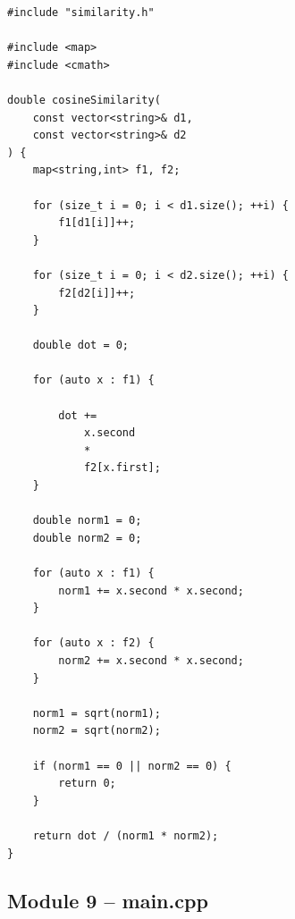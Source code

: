 \begin{lstlisting}
#include "similarity.h"

#include <map>
#include <cmath>

double cosineSimilarity(
    const vector<string>& d1,
    const vector<string>& d2
) {
    map<string,int> f1, f2;

    for (size_t i = 0; i < d1.size(); ++i) {
        f1[d1[i]]++;
    }

    for (size_t i = 0; i < d2.size(); ++i) {
        f2[d2[i]]++;
    }

    double dot = 0;

    for (auto x : f1) {

        dot +=
            x.second
            *
            f2[x.first];
    }

    double norm1 = 0;
    double norm2 = 0;

    for (auto x : f1) {
        norm1 += x.second * x.second;
    }

    for (auto x : f2) {
        norm2 += x.second * x.second;
    }

    norm1 = sqrt(norm1);
    norm2 = sqrt(norm2);

    if (norm1 == 0 || norm2 == 0) {
        return 0;
    }

    return dot / (norm1 * norm2);
}
\end{lstlisting}

\subsection{Module 9 -- main.cpp}

